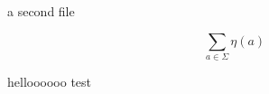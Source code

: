 \documentclass{article}
\begin{document}
a second file

\[
    \sum_{a\in\Sigma} \eta(a)
\]

helloooooo test
\end{document}
